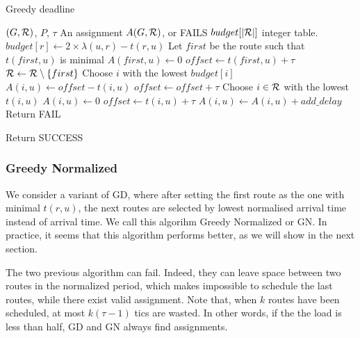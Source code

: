 \documentclass[english]{article}
\begin{document}
\begin{algorithm}[H]
	\caption{Greedy deadline}
	\begin{algorithmic}
	\REQUIRE $(G,{\cal R})$, $P$, $\tau$
	\ENSURE An assignment $A(G,{\cal R})$, or FAILS
	\STATE $budget[|{\cal R}|]$ integer table.
      \STATE  $budget[r] \leftarrow 2\times \lambda(u,r) - t(r,u)$
	\ENDFOR
	\STATE Let $first$ be the route such that $t(first,u)$ is minimal
	\STATE $A(first,u) \leftarrow 0$
	\STATE $offset \leftarrow t(first,u)+\tau$
	\STATE ${\cal R} \leftarrow {\cal R}\setminus \{first\}$
    \STATE Choose $i$ with the lowest $budget[i]$
    \STATE $A(i,u) \leftarrow offset - t(i,u)$
    \STATE $offset \leftarrow offset + \tau$
    \ELSE
     \STATE Choose $i \in {\cal R}$ with the lowest $t(i,u)$
     \STATE $A(i,u) \leftarrow 0$
     \STATE $offset \leftarrow t(i,u) + \tau$
    \ENDIF
    \STATE $A(i,u) \leftarrow A(i,u) + add\_delay$
    \ELSE
   \STATE Return FAIL
    \ENDIF
    \ENDIF
    
    \ENDWHILE
    \STATE Return SUCCESS
	\end{algorithmic}
	\end{algorithm}

\subsubsection{Greedy Normalized}

We consider a variant of GD, where after setting the first route as the one with minimal $t(r,u)$, the next routes are selected by lowest normalised arrival time instead of arrival time. We call this algorihm Greedy Normalized or GN.
In practice, it seems that this algorithm performs better, as we will show in the next section.

The two previous algorithm can fail. Indeed, they can leave space between two routes in the normalized period,
which makes impossible to schedule the last routes, while there exist valid assignment. Note that, when $k$ routes have been scheduled, at most $k(\tau -1)$ tics are wasted. In other words, if the the load is less than half, GD and GN always
find assignments.
\end{document}
